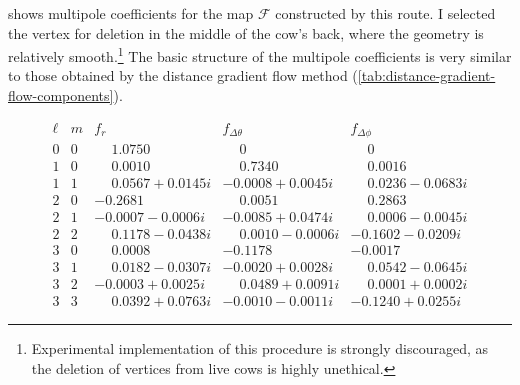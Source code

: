 \documentclass[
    prd, twocolumn, nofootinbib, amsmath, amssymb,
    aps, floatfix, preprintnumbers
]{revtex4-2}
\begin{document}
 shows multipole coefficients for the map $\mathcal F$ constructed by this route. I selected the vertex for deletion in the middle of the cow's back, where the geometry is relatively smooth.\footnote{Experimental implementation of this procedure is strongly discouraged, as the deletion of vertices from live cows is highly unethical.} The basic structure of the multipole coefficients is very similar to those obtained by the distance gradient flow method (\cref{tab:distance-gradient-flow-components}).

\begin{table}
    {\scriptsize
    \begin{equation*}
    \begin{array}{lr|c|c|c}
        \ell & m & f_r & f_{\Delta\theta} & f_{\Delta\phi} \\
        \hline
        0 & 0 &
             \phantom{-}1.0750\phantom{ + 0.0000ii} &
             \phantom{-}0\phantom{.0000}\phantom{ + 0.0000ii} &
             \phantom{-}0\phantom{.0000}\phantom{ + 0.0000ii} \\
        1 & 0 &
             \phantom{-}0.0010\phantom{ + 0.0000ii} &
             \phantom{-}0.7340\phantom{ + 0.0000ii} &
             \phantom{-}0.0016\phantom{ + 0.0000ii} \\
        1 & 1 &
             \phantom{-}0.0567 + 0.0145i &
             -0.0008 + 0.0045i &
             \phantom{-}0.0236 - 0.0683i \\
        2 & 0 &
             -0.2681\phantom{ + 0.0000ii} &
             \phantom{-}0.0051\phantom{ + 0.0000ii} &
             \phantom{-}0.2863\phantom{ + 0.0000ii} \\
        2 & 1 &
             -0.0007 - 0.0006i &
             -0.0085 + 0.0474i &
             \phantom{-}0.0006 - 0.0045i \\
        2 & 2 &
             \phantom{-}0.1178 - 0.0438i &
             \phantom{-}0.0010 - 0.0006i &
             -0.1602 - 0.0209i \\
        3 & 0 &
             \phantom{-}0.0008\phantom{ + 0.0000ii} &
             -0.1178\phantom{ + 0.0000ii} &
             -0.0017\phantom{ + 0.0000ii} \\
        3 & 1 &
             \phantom{-}0.0182 - 0.0307i &
             -0.0020 + 0.0028i &
             \phantom{-}0.0542 - 0.0645i \\
        3 & 2 &
             -0.0003 + 0.0025i &
             \phantom{-}0.0489 + 0.0091i &
             \phantom{-}0.0001 + 0.0002i \\
        3 & 3 &
             \phantom{-}0.0392 + 0.0763i &
             -0.0010 - 0.0011i &
             -0.1240 + 0.0255i
    \end{array}
    \end{equation*}
    }
    \caption{Multipole coefficients of the cow surface $\partial\mathcal C$ through the octupole in benchmark units, computed via the gradient flow method.}
    \label{tab:distance-gradient-flow-components}
\end{table}
\end{document}
